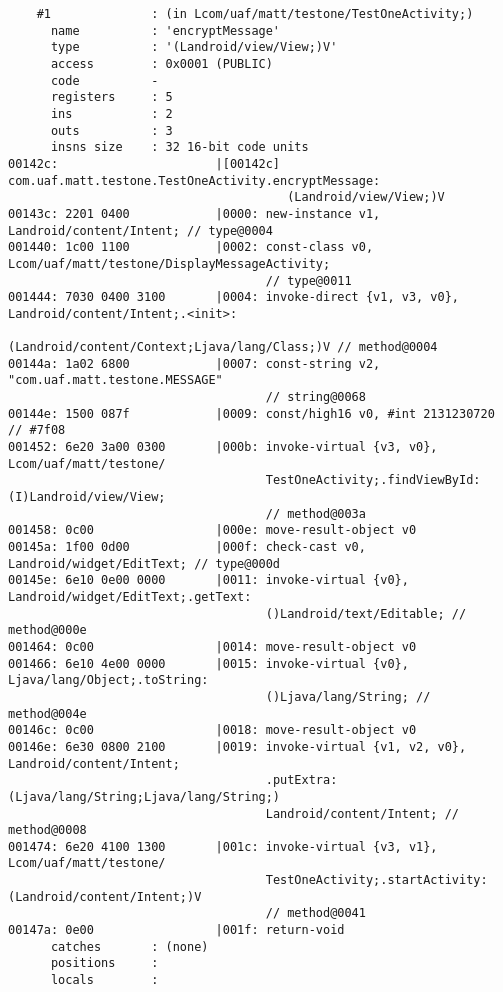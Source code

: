 \begin{lstlisting}
    #1              : (in Lcom/uaf/matt/testone/TestOneActivity;)
      name          : 'encryptMessage'
      type          : '(Landroid/view/View;)V'
      access        : 0x0001 (PUBLIC)
      code          -
      registers     : 5
      ins           : 2
      outs          : 3
      insns size    : 32 16-bit code units
00142c:                      |[00142c] com.uaf.matt.testone.TestOneActivity.encryptMessage:
                                       (Landroid/view/View;)V
00143c: 2201 0400            |0000: new-instance v1, Landroid/content/Intent; // type@0004
001440: 1c00 1100            |0002: const-class v0, Lcom/uaf/matt/testone/DisplayMessageActivity;
                                    // type@0011
001444: 7030 0400 3100       |0004: invoke-direct {v1, v3, v0}, Landroid/content/Intent;.<init>:
                                    (Landroid/content/Context;Ljava/lang/Class;)V // method@0004
00144a: 1a02 6800            |0007: const-string v2, "com.uaf.matt.testone.MESSAGE"
                                    // string@0068
00144e: 1500 087f            |0009: const/high16 v0, #int 2131230720 // #7f08
001452: 6e20 3a00 0300       |000b: invoke-virtual {v3, v0}, Lcom/uaf/matt/testone/
                                    TestOneActivity;.findViewById:(I)Landroid/view/View;
                                    // method@003a
001458: 0c00                 |000e: move-result-object v0
00145a: 1f00 0d00            |000f: check-cast v0, Landroid/widget/EditText; // type@000d
00145e: 6e10 0e00 0000       |0011: invoke-virtual {v0}, Landroid/widget/EditText;.getText:
                                    ()Landroid/text/Editable; // method@000e
001464: 0c00                 |0014: move-result-object v0
001466: 6e10 4e00 0000       |0015: invoke-virtual {v0}, Ljava/lang/Object;.toString:
                                    ()Ljava/lang/String; // method@004e
00146c: 0c00                 |0018: move-result-object v0
00146e: 6e30 0800 2100       |0019: invoke-virtual {v1, v2, v0}, Landroid/content/Intent;
                                    .putExtra:(Ljava/lang/String;Ljava/lang/String;)
                                    Landroid/content/Intent; // method@0008
001474: 6e20 4100 1300       |001c: invoke-virtual {v3, v1}, Lcom/uaf/matt/testone/
                                    TestOneActivity;.startActivity:(Landroid/content/Intent;)V
                                    // method@0041
00147a: 0e00                 |001f: return-void
      catches       : (none)
      positions     :
      locals        :


\end{lstlisting}
